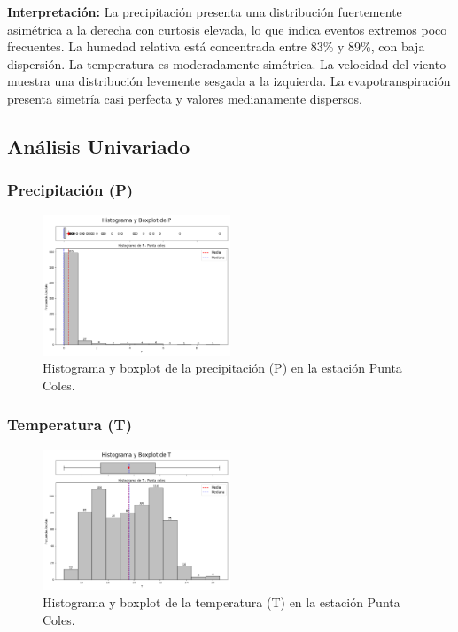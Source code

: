 \textbf{Interpretación:} La precipitación presenta una distribución fuertemente asimétrica a la derecha con curtosis elevada, lo que indica eventos extremos poco frecuentes. La humedad relativa está concentrada entre 83\% y 89\%, con baja dispersión. La temperatura es moderadamente simétrica. La velocidad del viento muestra una distribución levemente sesgada a la izquierda. La evapotranspiración presenta simetría casi perfecta y valores medianamente dispersos.

\subsection{Análisis Univariado}

\subsubsection*{Precipitación (P)}
\begin{figure}[H]
\centering
\includegraphics[width=0.5\textwidth]{resultados/por_estacion_meteorologica/Punta_Coles/P_histograma.png}
\caption{Histograma y boxplot de la precipitación (P) en la estación Punta Coles.}
\label{fig:punta_coles_P}
\end{figure}

\subsubsection*{Temperatura (T)}
\begin{figure}[H]
\centering
\includegraphics[width=0.5\textwidth]{resultados/por_estacion_meteorologica/Punta_Coles/T_histograma.png}
\caption{Histograma y boxplot de la temperatura (T) en la estación Punta Coles.}
\label{fig:punta_coles_T}
\end{figure}

